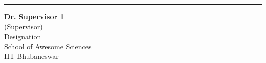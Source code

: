 \vspace*{15pt}
\begin{center}
    \begin{minipage}{0.4\textwidth}
    \begin{center}
        \hrule\vspace{2ex}
        {\small {\bfseries Dr. Supervisor 1}\\
        (Supervisor)\\
        Designation\\
        School of Awesome Sciences\\
        IIT Bhubaneswar}
    \end{center}
    \end{minipage}

\end{center}

